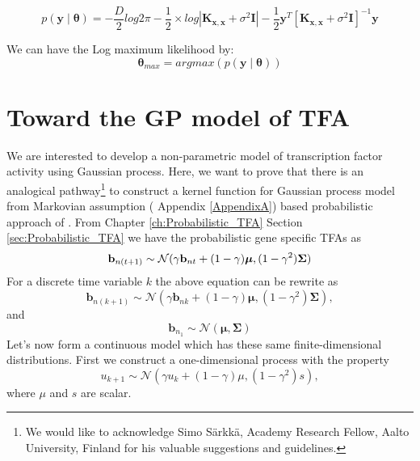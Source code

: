 \begin{equation} \label{eq:Likelihood}
 p \left(\mathbf{y}\middle|\boldsymbol{\theta}\right) =
    - \frac{D}{2}log2\pi - \frac{1}{2}\times log \left| \mathbf{K_{x,x}} + \sigma^2\mathbf{I}\right|
    - \frac{1}{2}\mathbf{y}^T \left[\mathbf{K_{x,x}} + \sigma^2\mathbf{I} \right]^{-1}\mathbf{y}
\end{equation}

We can have the Log maximum likelihood by:
\begin{equation} \label{eq:LML}
 \boldsymbol{\theta}_{max} = argmax \left( p\left(\mathbf{y}\middle|\boldsymbol{\theta}\right) \right)
\end{equation}


\section{Toward the GP model of TFA}
 We are interested to develop a non-parametric model of transcription factor activity using Gaussian process. Here, we want to prove that there is an analogical pathway\footnote{We would like to acknowledge Simo S\"arkk\"a, Academy Research Fellow, Aalto University, Finland for his valuable suggestions and guidelines.} to construct a kernel function for Gaussian process model from Markovian assumption ({\color{red} Appendix \ref{AppendixA}}) based probabilistic approach of \cite{Sanguinetti:2006}. From Chapter \ref{ch:Probabilistic_TFA} Section \ref{sec:Probabilistic_TFA} we have the probabilistic gene specific TFAs as
\begin{equation} \label{eq:tfa_SanG_updateCh4}
  \bold{b}_{n(t+1)} \sim \mathcal{N} (\gamma \bold{b}_{nt} + (1-\gamma)\boldsymbol{\mu},(1-\gamma^2)\bold{\Sigma})
\end{equation}
For a discrete time variable $k$ the above equation can be rewrite as
\begin{equation}
\textbf{b}_{n(k+1)} \sim \mathcal{N}\left(\gamma \textbf{b}_{nk} + (1 - \gamma) \boldsymbol{\mu}, (1 - \gamma^2) \boldsymbol{\Sigma}\right),
\end{equation}
and
\begin{equation}
\textbf{b}_{n_1} \sim \mathcal{N}\left(\boldsymbol{\mu}, \boldsymbol{\Sigma}\right)
\end{equation}
Let's now form a continuous model which has these same finite-dimensional distributions. First we construct a one-dimensional process with the property
\begin{equation}
u_{k+1} \sim \mathcal{N}\left(\gamma u_k + \left(1 - \gamma\right) \mu, (1 - \gamma^2)s \right),
\end{equation}
where $\mu$ and $s$ are scalar.

